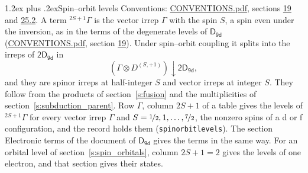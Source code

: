 \documentclass[10pt,a4paper]{article}
\makeatletter
\renewcommand\section{\@startsection{section}{1}{\z@}{-3ex plus -1ex minus -.2ex}%
  {1.2ex plus .2ex}{\normalfont\large\sffamily\bfseries\color{parttitle}}}
\numberwithin{equation}{section}
\newcommand{\grp}[1]{\mathsf{#1}}
\newcommand{\restr}[2]{#1\!\downarrow#2}
\newcommand{\irrJp}[2]{D^{(#1,#2)}}
\newcommand{\irrprod}{\otimes}
\newcommand{\term}[2]{{}^{#1}#2}
\makeatother
\begin{document}
\section{Spin--orbit levels}\label{s:spin_orbit}
Conventions: \href{../../CONVENTIONS.pdf}{CONVENTIONS.pdf}, sections \href{../../../rotation/CONVENTIONS.pdf\#conv.19}{19} and \href{../../CONVENTIONS.pdf\#conv.25.2}{25.2}.
\leavevmode\label{n:local.spin}\label{n:symbol.term}A term $\term{2S+1}{\Gamma}$ is the vector irrep $\Gamma$ with the spin $S$, a spin even under the inversion, as in the terms of the degenerate levels of \href{../../../rotation/data/pdf/D9d.pdf}{$\grp{D_{9d}}$} (\href{../../CONVENTIONS.pdf}{CONVENTIONS.pdf}, section \href{../../../rotation/CONVENTIONS.pdf\#conv.19}{19}). Under spin--orbit coupling it splits into the irreps of $\grp{2D_{9d}}$ in
\begin{equation}\label{e:spinorbit}\restr{(\Gamma \irrprod \irrJp{S}{+1})}{\grp{2D_{9d}}},\end{equation}
and they are spinor irreps at half-integer $S$ and vector irreps at integer $S$. They follow from the products of section~\ref{s:fusion} and the multiplicities of section~\ref{s:subduction_parent}. Row $\Gamma$, column $2S + 1$ of a table gives the levels of $\term{2S+1}{\Gamma}$ for every vector irrep $\Gamma$ and $S = \nicefrac{1}{2}, 1, \dots, \nicefrac{7}{2}$, the nonzero spins of a d or f configuration, and the record holds them (\texttt{spinorbitlevels}). The section Electronic terms of the document of \href{../../../rotation/data/pdf/D9d.pdf}{$\grp{D_{9d}}$} gives the terms in the same way. For an orbital level of section~\ref{s:spin_orbitals}, column $2S + 1 = 2$ gives the levels of one electron, and that section gives their states.
\end{document}
